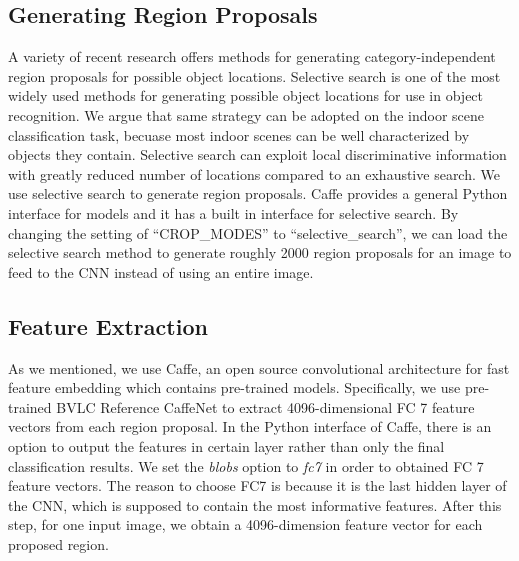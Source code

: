 \subsection{Generating Region Proposals}
A variety of recent research offers methods for generating category-independent
region proposals for possible object locations. Selective search is one of the
most widely used methods for generating possible object locations for use in
object recognition\cite{Uijlings:2013:SSO}. We argue that same strategy can be
adopted on the indoor scene classification task, becuase most indoor scenes can
be well characterized by objects they contain. Selective search can exploit
local discriminative information with greatly reduced number of locations
compared to an exhaustive search.  We use selective search to generate region
proposals. Caffe provides a general Python interface for models and it has
a built in interface for selective search. By changing the setting of
``CROP\_MODES'' to ``selective\_search'', we can load the selective search
method to generate roughly 2000 region proposals for an image to feed to the
CNN instead of using an entire image.

\subsection{Feature Extraction}
As we mentioned, we use Caffe, an open source convolutional architecture for
fast feature embedding which contains pre-trained models. Specifically, we use
pre-trained BVLC Reference CaffeNet to extract 4096-dimensional FC 7 feature
vectors from each region proposal. In the Python interface of Caffe, there is
an option to output the features in certain layer rather than only the final
classification results. We set the \textit{blobs} option to \textit{fc7} in
order to obtained FC 7 feature vectors.  The reason to choose FC7 is because it
is the last hidden layer of the CNN, which is supposed to contain the most
informative features. After this step, for one input image, we obtain
a 4096-dimension feature vector for each proposed region.

